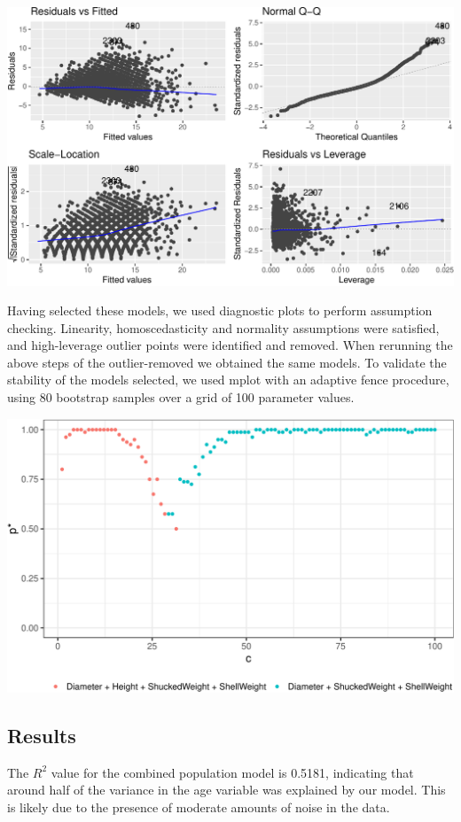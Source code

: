 \documentclass[letterpaper,9pt,twocolumn,twoside,]{pinp}
\begin{document}
\begin{center}\includegraphics[width=0.8\linewidth]{Executive-summary-Group-Work_files/figure-latex/unnamed-chunk-3-1} \end{center}

Having selected these models, we used diagnostic plots to perform
assumption checking. Linearity, homoscedasticity and normality
assumptions were satisfied, and high-leverage outlier points were
identified and removed. When rerunning the above steps of the
outlier-removed we obtained the same models. To validate the stability
of the models selected, we used mplot with an adaptive fence procedure,
using 80 bootstrap samples over a grid of 100 parameter values.

\begin{center}\includegraphics[width=0.8\linewidth]{Executive-summary-Group-Work_files/figure-latex/unnamed-chunk-4-1} \end{center}

\hypertarget{results}{%
\subsection{Results}\label{results}}

The \(R^2\) value for the combined population model is 0.5181,
indicating that around half of the variance in the age variable was
explained by our model. This is likely due to the presence of moderate
amounts of noise in the data.
\end{document}
